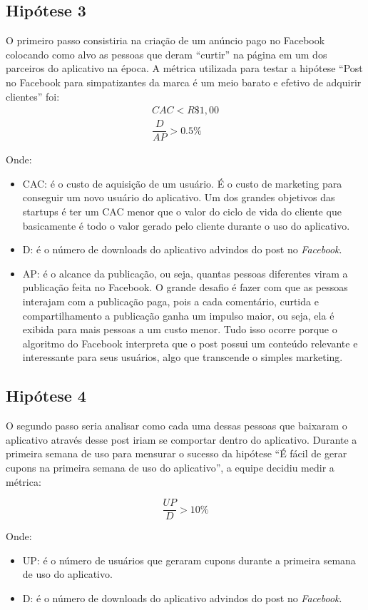 \subsection{Hipótese 3}
\label{cha:hip_3}
O primeiro passo consistiria na criação de um anúncio pago no Facebook colocando como alvo as pessoas que deram \enquote{curtir} na página em um dos parceiros do aplicativo na época. A métrica utilizada para testar a hipótese \enquote{Post no Facebook para simpatizantes da marca é um meio barato e efetivo de adquirir clientes} foi:
\begin{align*} 
CAC < R\$1,00 \\
\dfrac{D}{AP} > 0.5\%
\end{align*}

Onde: 
\begin{itemize}
\item CAC: é o custo de aquisição de um usuário. É o custo de marketing para conseguir um novo usuário do aplicativo. Um dos grandes objetivos das startups é ter um CAC menor que o valor do ciclo de vida do cliente que basicamente é todo o valor gerado pelo cliente durante o uso do aplicativo.
\item D: é o número de downloads do aplicativo advindos do post no \textit{Facebook}.
\item AP: é o alcance da publicação, ou seja, quantas pessoas diferentes viram a publicação feita no Facebook. O grande desafio é fazer com que as pessoas interajam com a publicação paga, pois a cada comentário, curtida e compartilhamento a publicação ganha um impulso maior, ou seja, ela é exibida para mais pessoas a um custo menor. Tudo isso ocorre porque o algoritmo do Facebook interpreta que o post possui um conteúdo relevante e interessante para seus usuários, algo que transcende o simples marketing.
\end{itemize}

\subsection{Hipótese 4}
\label{cha:hip_4}
O segundo passo seria analisar como cada uma dessas pessoas que baixaram o aplicativo através desse post iriam se comportar dentro do aplicativo. Durante a primeira semana de uso para mensurar o sucesso da hipótese \enquote{É fácil de gerar cupons na primeira semana de uso do aplicativo}, a equipe decidiu medir a métrica:

\[\dfrac{UP}{D} > 10\%\]

Onde: 
\begin{itemize}
\item UP: é o número de usuários que geraram cupons durante a primeira semana de uso do aplicativo.
\item D: é o número de downloads do aplicativo advindos do post no \textit{Facebook}.
\end{itemize}

